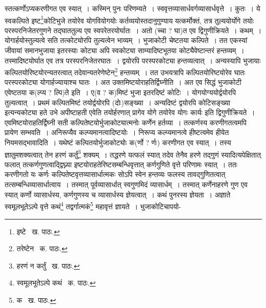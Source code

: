 \documentclass[11pt, openany]{book}
\begin{document}
\noindent स्तत्कर्णोऽप्यकरणीगत एव स्यात्~। कस्मिन् पुनः परिणम्यते~। स्ववृत्तव्यासार्धवर्गव्यासार्धवृत्ते~। कुतः~। ये स्वकल्पिते इष्ट\renewcommand{\thefootnote}{१}\footnote{इष्टे \textendash\ ख. पाठः.}कोटिभुजे तयोरेव योगवियोगयोः कर्तव्ययोस्तदानुगुण्याय यत्कर्मोक्तं, तत्र तुल्ययोर्योगे तयोः परस्परनिजेतरगुणने तद्घाततुल्य एव स्वपरेतरयोर्घातः~। अतो (च्चा ? घा)त एव द्विगुणीक्रियते~। कथम्~। योगार्हयोस्तुल्यत्वे सति तत्कोट्योरपि तुल्यत्वेन भाव्यम्~। भुजाकोटी चेष्टतया कल्पिते~। तत एकस्यां जीवायां समानभुजाया इतरस्याः कोट्या अपि स्वकोट्या साम्यादिष्टभूतया कोट्यैवेष्टान्तरं हन्तव्यम्~। तस्मादिष्टयोर्घात एव तत्र परस्परनिजेतरघातः~। द्वयोरपि परस्परकोट्या हन्तव्यत्वात्~। अन्यस्यापि भुजायाः कल्पितयोरिष्टयोरन्यतरत्वात् तदेवान्यतरेणेष्टेन\renewcommand{\thefootnote}{२}\footnote{तरेष्टेन \textendash\ क. पाठः.} हन्तव्यम्~। तत उभयत्रापि कल्पितयोरिष्टयोरेव घातः परस्परकोट्या योगार्हज्यायाश्च घातः~। अत उक्तमिष्टयोराहतिर्द्विघ्नीति~। अत एव सिद्धं भुजाकोटी एवेष्टतया क(ल्प्य ? ल्पि)ते इति~। ए(व ? क)मिष्टं भुजा इतरदिष्टं कोटिः~। योगयोग्ययोर्द्वयोरपि तुल्यत्वात्~। प्रथमं कल्पितमिष्टं तयोर्द्वयोरपि (दोः)सङ्ख्या~। अन्यदिष्टं द्वयोरपि कोटिसङ्ख्या इत्यन्यकोट्या हते उभे अपीष्टाहती एवेति तयोर्हरणात् प्रागेव योगे तयोरेव योगः कार्यः इति द्विगुणीक्रियते~। एवमिष्टयोराहतिर्द्विघ्नी सती कल्पितेष्टयोर्भुजाकोट्यात्मनोः कर्णेन हर्तव्या~। तत्कर्णस्य करणीगतत्वमपि प्रायेण सम्भवति~। अनिरूप्यैव कल्प्यमानत्वादिष्टयोः~। निरूप्य कल्प्यमानत्वे हीष्टत्वमेव हीयेत नियमसद्भावादिति~। यथेष्टं कल्पितयोर्भुजाकोट्योः क(र्णो ? र्णः) करणीगत एव स्यात्~। तस्य ज्ञातुमशक्यत्वात् तेन हरणं कर्तुं\renewcommand{\thefootnote}{३}\footnote{हरणं न कर्तुं \textendash\ ख. पाठः.} शक्यम्~। तद्धरणे यत्फलं स्यात् तदेव तेनैव हरणे तद्गुणं स्यादित्यपेक्षितात् फलात् तत्कर्णगुणत्वाद्द्विघ्न्या इष्टयोराहतेरिष्टसम्बन्धिवृत्तात् कर्णगुणिते वृत्ते परिणामः स्यात्~। ततः करणीगतो यः कर्णः कल्पितेष्टवृत्तव्यासार्धात्मकः सोऽपि स्वेन हन्तव्यः फलस्य तावद्गुणितत्वात् तत्सम्बन्धिव्यासार्धात्वाय~। तस्मात् पूर्वव्यासार्धात् स्वगुणमिदं व्यासार्धम्~। तस्मात् कर्णेनाहरणे गुण एव स्यात् कर्णो व्यासार्धस्य, कर्णगुणस्य च व्यासार्धस्य ज्ञेयत्वात्~। कथं पुनरस्य ज्ञेयता~। अज्ञाते स्वमूलभूतेऽल्पे वृत्ते कथं\renewcommand{\thefootnote}{४}\footnote{स्वमूलभूतेऽल्पे कथं \textendash\ क. पाठः.} तद्वर्गात्मकं\renewcommand{\thefootnote}{५}\footnote{क \textendash\ ख. पाठः.} महावृत्तं ज्ञायते~। भुजाकोटिचापयो-

\newpage
\end{document}
